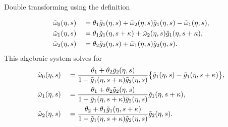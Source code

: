 Double transforming \DIFdelbegin {}\DIFdelend \DIFaddbegin {}\DIFaddend using the definition \DIFdelbegin {}%

\DIFdelend \DIFaddbegin {}\begin{alignat}{2}
	&\tilde{\omega}_{0}(\eta,s) &&= \theta_1 \tilde{g}_1(\eta,s) + \tilde{\omega}_2(\eta,s)\tilde{g}_1(\eta,s)-\tilde{\omega}_{1}(\eta,s),\\
	&\tilde{\omega}_{1}(\eta,s) &&= \theta_1\tilde{g}_1(\eta,s+\kappa) + \tilde{\omega}_2(\eta,s)\tilde{g}_1(\eta,s+\kappa),\\
	&\tilde{\omega}_2(\eta,s) &&= \theta_2 \tilde{g}_2(\eta,s) + \tilde{\omega}_{1}(\eta,s)\tilde{g}_2(\eta,s).
\end{alignat}\DIFaddend 
This algebraic system solves for 
\DIFdelbegin %
\DIFdelend \DIFaddbegin \begin{alignat}{2}
	&\tilde{\omega}_{0}(\eta,s) &&= \frac{\theta_1 + \theta_2 \tilde{g}_2(\eta,s)}{1-\tilde{g}_1(\eta,s+\kappa)\tilde{g}_2(\eta,s)}\big\{\tilde{g}_1(\eta,s)-\tilde{g}_1(\eta,s+\kappa) \big\}, \label{eq:A} \\
	&\tilde{\omega}_{1}(\eta,s) &&= \frac{\theta_1 + \theta_2 \tilde{g}_2(\eta,s)}{1-\tilde{g}_1(\eta,s+\kappa)\tilde{g}_2(\eta,s)}\tilde{g}_1(\eta,s+\kappa),\\
	&\tilde{\omega}_{2}(\eta,s) &&= \frac{\theta_2 + \theta_1 \tilde{g}_1(\eta,s+\kappa)}{1-\tilde{g}_1(\eta,s+\kappa)\tilde{g}_2(\eta,s)}\tilde{g}_2(\eta,s). 
\end{alignat}\DIFaddend 
